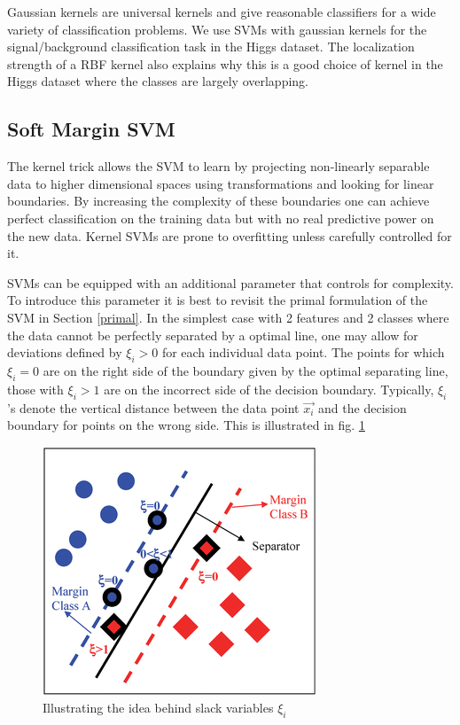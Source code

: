 \documentclass[final,3p,times,twocolumn]{elsarticle}
\begin{document}
Gaussian kernels are universal kernels and give reasonable classifiers for a wide variety of classification problems. We use SVMs with gaussian kernels for the signal/background classification task in the Higgs dataset. The localization strength of a RBF kernel also explains why this is a good choice of kernel in the Higgs dataset where the classes are largely overlapping. 

\subsection{Soft Margin SVM}
\label{softsvm}

The kernel trick allows the SVM to learn by projecting non-linearly separable data to higher dimensional spaces using transformations and looking for linear boundaries. By increasing the complexity of these boundaries one can achieve perfect classification on the training data but with no real predictive power on the new data. Kernel SVMs are prone to overfitting unless carefully controlled for it. 

SVMs can be equipped with an additional parameter that controls for complexity. To introduce this parameter it is best to revisit the primal formulation of the SVM in Section \ref{primal}. In the simplest case with 2 features and 2 classes where the data cannot be perfectly separated by a optimal line, one may allow for deviations defined by $\xi_{i} > 0$ for each individual data point. The points for which $\xi_{i} = 0$ are on the right side of the boundary given by the optimal separating line, those with $\xi_{i} > 1$ are on the incorrect side of the decision boundary. Typically, $\xi_{i}$'s denote the vertical distance between the data point $\vec{x_{i}}$ and the decision boundary for points on the wrong side. This is illustrated in fig. \ref{soft_margin}

\begin{figure}
\hspace{0.5cm} \includegraphics[scale=0.5]{Images/soft_margin.png}
\caption{Illustrating the idea behind slack variables $\xi_{i}$}
\label{soft_margin}
\end{figure}
\end{document}
